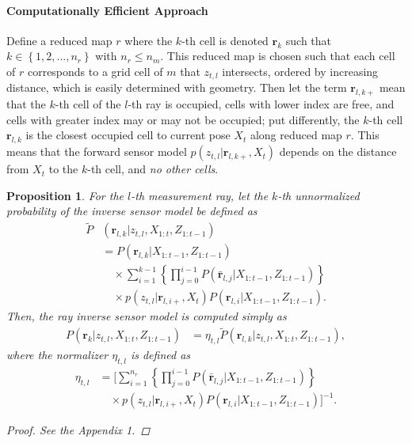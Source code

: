 \documentclass[letterpaper, 10pt, conference]{ieeeconf}
\newcommand{\braces}[1]{\ensuremath{\left\{ #1 \right\}}}
\newtheorem{prop}{Proposition}
\begin{document}
\paragraph{Computationally Efficient Approach}
Define a reduced map $r$ where the $k$-th cell is denoted $\mathbf{r}_k$ such that $k\in\braces{1,2,...,n_r}$ with $n_r\leq n_m$.
This reduced map is chosen such that each cell of $r$ corresponds to a grid cell of $m$ that $z_{t,l}$ intersects, ordered by increasing distance, which is easily determined with geometry.
Then let the term $\mathbf{r}_{l,k+}$ mean that the $k$-th cell of the $l$-th ray is occupied, cells with lower index are free, and cells with greater index may or may not be occupied; put differently, the $k$-th cell $\mathbf{r}_{l,k}$ is the closest occupied cell to current pose $X_t$ along reduced map $r$.
This means that the forward sensor model $p(z_{t,l}|\mathbf{r}_{l,k+},X_{t})$ depends on the distance from $X_t$ to the $k$-th cell, and \emph{no other cells}.



\begin{prop}
For the $l$-th measurement ray, let the $k$-th unnormalized probability of the inverse sensor model be defined as
\begin{align}
\label{eqn:Unnormalized}
\tilde P&(\mathbf{r}_{l,k}|z_{t,l},X_{1:t},Z_{1:t-1})%
\nonumber\\&=P(\mathbf{r}_{l,k}|X_{1:t-1},Z_{1:t-1})\nonumber\\
&\quad\times \sum_{i=1}^{k-1}\left\{\prod_{j=0}^{i-1}P(\bar{\mathbf{r}}_{l,j}|X_{1:t-1},Z_{1:t-1})\right\}\nonumber\\
&\quad\times p(z_{t,l}|\mathbf{r}_{l,i+},X_t)P(\mathbf{r}_{l,i}|X_{1:t-1},Z_{1:t-1})
.
\end{align}
Then, the ray inverse sensor model is computed simply as
\begin{align}
\label{eqn:RayISMAnswer}
P(\mathbf{r}_k|z_{t,l},X_{1:t},Z_{1:t-1})&=\eta_{t,l}\tilde P(\mathbf{r}_{l,k}|z_{t,l},X_{1:t},Z_{1:t-1}),
\end{align}
where the normalizer $\eta_{t,l}$ is defined as
\begin{align}
\label{eqn:allEta}
\eta_{t,l}
&=
\bigg[\sum_{i=1}^{n_r}\left\{\prod_{j=0}^{i-1}P(\bar{\mathbf{r}}_{l,j}|X_{1:t-1},Z_{1:t-1})\right\}\nonumber\\&\quad\times p(z_{t,l}|\mathbf{r}_{l,i+},X_t)P(\mathbf{r}_{l,i}|X_{1:t-1},Z_{1:t-1})\bigg]^{-1}.
\end{align}
\begin{proof}
See the Appendix 1.
\end{proof}
\end{prop}
\end{document}
